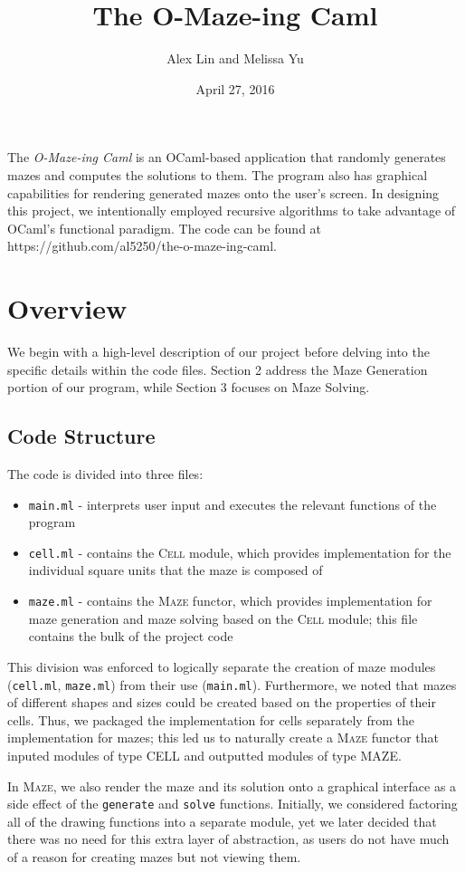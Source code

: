 \documentclass[11pt, margin=1in]{article}
\newcommand{\tab}{\par \qquad}
\begin{document}
\title{The O-Maze-ing Caml}
\author{Alex Lin and Melissa Yu}
\date{April 27, 2016}
\maketitle

\setlength\parindent{0pt}

The \textit{O-Maze-ing Caml} is an OCaml-based application that randomly generates mazes and computes the solutions to them.  The program also has graphical capabilities for rendering generated mazes onto the user's screen.  In designing this project, we intentionally employed recursive algorithms to take advantage of OCaml's functional paradigm.  The code can be found at https://github.com/al5250/the-o-maze-ing-caml.  

\section{Overview}

We begin with a high-level description of our project before delving into the specific details within the code files.  Section 2 address the Maze Generation portion of our program, while Section 3 focuses on Maze Solving.  

\subsection{Code Structure}  %
The code is divided into three files:
\begin{itemize}
\item \texttt{main.ml} - interprets user input and executes the relevant functions of the program  
\item \texttt{cell.ml} - contains the \textsc{Cell} module, which provides implementation for the individual square units that the maze is composed of
\item \texttt{maze.ml} - contains the \textsc{Maze} functor, which provides implementation for maze generation and maze solving based on the \textsc{Cell} module; this file contains the bulk of the project code   
\end{itemize} 


This division was enforced to logically separate the creation of maze modules (\texttt{cell.ml}, \texttt{maze.ml}) from their use (\texttt{main.ml}).  Furthermore, we noted that mazes of different shapes and sizes could be created based on the properties of their cells.  Thus, we packaged the implementation for cells separately from the implementation for mazes; this led us to naturally create a \textsc{Maze} functor that inputed modules of type \textsc{CELL} and outputted modules of type \textsc{MAZE}.
\tab In \textsc{Maze}, we also render the maze and its solution onto a graphical interface as a side effect of the \texttt{generate} and \texttt{solve} functions.  Initially, we considered factoring all of the drawing functions into a separate module, yet we later decided that there was no need for this extra layer of abstraction, as users do not have much of a reason for creating mazes but not viewing them.     
\end{document}

